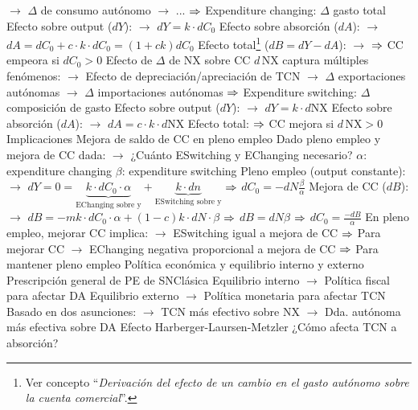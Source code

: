 \documentclass{nuevotema}
\begin{document}
\begin{esquemal}
				\4[] $\to$ $\Delta$ de consumo autónomo
				\4[] $\to$ ...
				\4[] $\Rightarrow$ Expenditure changing: $\Delta$ gasto total
				\4[] Efecto sobre output ($d Y$):
				\4[] $\to$ $d Y = k \cdot d C_0$
				\4[] Efecto sobre absorción ($dA$):
				\4[] $\to$ $d A = dC_0 + c \cdot k \cdot d C_0 = (1+ck)d  C_0$
				\4[] Efecto total\footnote{Ver concepto ``\textit{Derivación del efecto de un cambio en el gasto autónomo sobre la cuenta comercial}''.} ($dB = dY - dA$):
				\4[] $\to$ 
				\4[] $\Rightarrow$ CC empeora si $d C_0 > 0$
				\4 Efecto de $\Delta$ de $\text{NX}$ sobre CC
				\4[] $d \, \text{NX}$ captura múltiples fenómenos:
				\4[] $\to$ Efecto de depreciación/apreciación de TCN
				\4[] $\to$ $\Delta$ exportaciones autónomas
				\4[] $\to$ $\Delta$ importaciones autónomas
				\4[] $\Rightarrow$ Expenditure switching: $\Delta$ composición de gasto
				\4[] Efecto sobre output ($d Y$):
				\4[] $\to$ $d Y = k \cdot d \text{NX}$
				\4[] Efecto sobre absorción ($d A$):
				\4[] $\to$ $d A = c \cdot k \cdot d \text{NX}$
				\4[] Efecto total:
				\4[] 
				\4[] $\Rightarrow$ CC mejora si $d \, \text{NX} > 0$
			\3 Implicaciones
				\4 Mejora de saldo de CC en pleno empleo
				\4[] Dado pleno empleo y mejora de CC dada:
				\4[] $\to$ ¿Cuánto ESwitching y EChanging necesario?
				\4[] $\alpha$: expenditure changing
				\4[] $\beta$: expenditure switching
				\4[] Pleno empleo (output constante):
				\4[] $\to$ $dY = 0 = \underbrace{k\cdot d C_0 \cdot \alpha}_{\text{EChanging sobre y}} + \underbrace{k\cdot d n}_{\text{ESwitching sobre y}}$
				\4[] $\Rightarrow$ $d C_0 = - d N \frac{\beta}{\alpha}$
				\4[] Mejora de CC ($dB$):
				\4[] $\to$ $d B = -mk \cdot d C_0 \cdot \alpha + (1-c)k \cdot d N \cdot \beta$
				\4[] $\Rightarrow$ $d B = d N \beta$
				\4[] $\Rightarrow$ $d C_0 = \frac{-d B}{\alpha}$
				\4[] En pleno empleo, mejorar CC implica:
				\4[] $\to$ ESwitching igual a mejora de CC
				\4[] $\Rightarrow$ Para mejorar CC
				\4[] $\to$ EChanging negativa proporcional a mejora de CC
				\4[] $\Rightarrow$ Para mantener pleno empleo
				\4 Política económica y equilibrio interno y externo
				\4[] Prescripción general de PE de SNClásica
				\4[] Equilibrio interno
				\4[] $\to$ Política fiscal para afectar DA
				\4[] Equilibrio externo
				\4[] $\to$ Política monetaria para afectar TCN
				\4[] Basado en dos asunciones:
				\4[] $\to$ TCN más efectivo sobre NX
				\4[] $\to$ Dda. autónoma más efectiva sobre DA
				\4 Efecto Harberger-Laursen-Metzler
				\4[] ¿Cómo afecta TCN a absorción?

\end{esquemal}
\end{document}
